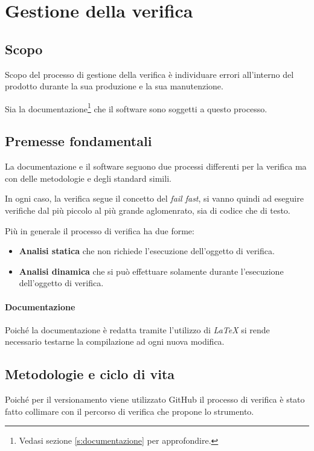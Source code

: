 \section{Gestione della verifica}\label{s:verifica}
\subsection{Scopo}

Scopo del processo di gestione della verifica è individuare errori all'interno del prodotto durante la sua produzione e la sua manutenzione.

Sia la documentazione\footnote{Vedasi sezione \ref{s:documentazione} per approfondire.} che il software sono soggetti a questo processo.

\subsection{Premesse fondamentali}

La documentazione e il software seguono due processi differenti per la verifica ma con delle metodologie e degli standard simili.

In ogni caso, la verifica segue il concetto del \textit{fail fast}, si vanno quindi ad eseguire verifiche dal più piccolo al più grande aglomenrato, sia di codice che di testo.

Più in generale il processo di verifica ha due forme:
\begin{itemize}
    \item \textbf{Analisi statica} che non richiede l'esecuzione dell'oggetto di verifica.
    \item \textbf{Analisi dinamica} che si può effettuare solamente durante l'esecuzione dell'oggetto di verifica.
\end{itemize}

\paragraph{Documentazione} Poiché la documentazione è redatta tramite l'utilizzo di \textit{LaTeX} si rende necessario testarne la compilazione ad ogni nuova modifica.

\subsection{Metodologie e ciclo di vita}

Poiché per il versionamento viene utilizzato GitHub il processo di verifica è stato fatto collimare con il percorso di verifica che propone lo strumento.

